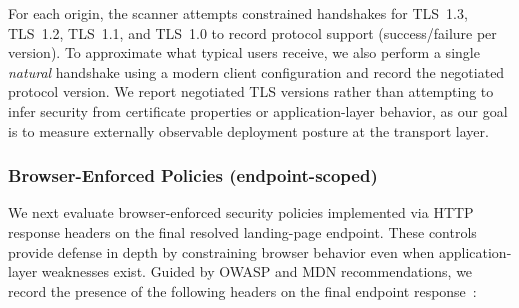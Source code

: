 \documentclass[a4paper,fleqn]{cas-sc}
\begin{document}
    For each origin, the scanner attempts constrained handshakes for TLS~1.3, TLS~1.2, TLS~1.1, and TLS~1.0 to record protocol support (success/failure per version). 
    To approximate what typical users receive, we also perform a single \emph{natural} handshake using a modern client configuration and record the negotiated protocol version. We report negotiated TLS versions rather than attempting to infer security from certificate properties or application-layer behavior, as our goal is to measure externally observable deployment posture at the transport layer. 


\subsubsection{Browser-Enforced Policies (endpoint-scoped)}\label{sec:browser_policies}

    We next evaluate browser-enforced security policies implemented via HTTP response headers on the final resolved landing-page endpoint. 
    These controls provide defense in depth by constraining browser behavior even when application-layer weaknesses exist. 
    Guided by OWASP and MDN recommendations, we record the presence of the following headers on the final endpoint response~\cite{owasp_http_security_response_headers,mdn_csp_guide}:
\end{document}

